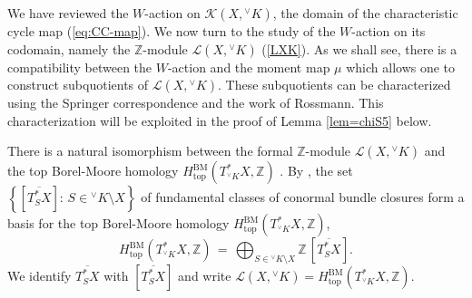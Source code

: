\documentclass[a4paper, 11pt]{article}
\begin{document}
We have reviewed the $W$-action on $\mathscr{K}(X, {^\vee}K)$, the
domain of the characteristic cycle map (\ref{eq:CC-map}). We now turn
to the study of the $W$-action on its codomain, namely the   $\mathbb{Z}$-module
$\mathscr{L}(X,{^\vee}K)$ (\ref{LXK}).  As we shall see, there is a
compatibility between the $W$-action and the moment map $\mu$ which
allows one to construct subquotients of $\mathscr{L}(X,{^\vee}K)$.
These subquotients can be characterized using the Springer
correspondence and the work of Rossmann.  This characterization will be
exploited in the proof of Lemma \ref{lem=chiS5} below.  

There is a natural isomorphism
between the formal $\mathbb{Z}$-module $\mathscr{L}(X,{^\vee}K)$ and
the top Borel-Moore homology  $H_{\mathrm{top}}^{\mathrm{BM}} (T_{{^\vee}K}^{\ast}X,
\mathbb{Z})$ \cite[Section 2.2]{Maxim}.
By \cite[Lemma 19.1.1]{fulton}, the set
$\left\{[\overline{T_S^{\ast}X}]:\, S\in {^\vee}K\setminus X\right\}$  
of fundamental classes of conormal bundle closures form a basis for
the top Borel-Moore homology  $H_{\mathrm{top}}^{\mathrm{BM}}
( T_{{^\vee}K}^{\ast} X,\mathbb{Z})$, 
$$H_{\mathrm{top}}^{\mathrm{BM}} (T_{{^\vee}K}^{\ast}X, \mathbb{Z})\, =\,
\bigoplus_{S\in {^\vee}K\setminus X} \mathbb{Z}\,
[\overline{T_S^{\ast}X}]. 
$$
We identify $\overline{T_S^{\ast}X}$ with $[\overline{T_S^{\ast}X}]$ and write
$\mathscr{L}(X,{^\vee}K) = H_{\mathrm{top}}^{\mathrm{BM}}
(T_{{^\vee}K}^{\ast}X, \mathbb{Z})$. 
\end{document}
